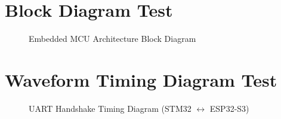 \documentclass[a4paper]{article}
\begin{document}
\section*{Block Diagram Test}
\begin{figure}[H]
  \centering
  \resizebox{0.98\textwidth}{!}{}
  \caption{Embedded MCU Architecture Block Diagram}
\end{figure}

\clearpage
\section*{Waveform Timing Diagram Test}
\begin{figure}[H]
  \centering
  \resizebox{0.98\textwidth}{!}{}
  \caption{UART Handshake Timing Diagram (STM32 $\leftrightarrow$ ESP32-S3)}
\end{figure}
\end{document}

